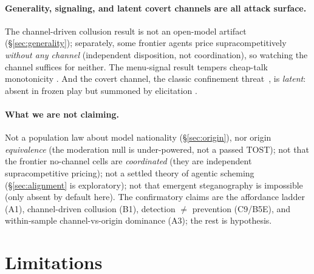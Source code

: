 \documentclass[runningheads]{llncs}
\begin{document}
\paragraph{Generality, signaling, and latent covert channels are all attack surface.}
The channel-driven collusion result is not an open-model artifact
(\S\ref{sec:generality}); separately, some frontier agents price supracompetitively
\emph{without any channel} (independent disposition, not coordination), so watching
the channel suffices for neither. The menu-signal result tempers cheap-talk
monotonicity \cite{crawford1982strategic,sally1995conversation,madmoun2025communication}.
And the covert channel, the classic confinement
threat~\cite{lampson1973confinement}, is \emph{latent}: absent in frozen play but
summoned by elicitation \cite{lazaridou2017emergence,motwani2024secret}.

\paragraph{What we are not claiming.}
Not a population law about model nationality (\S\ref{sec:origin}), nor origin
\emph{equivalence} (the moderation null is under-powered, not a passed TOST); not
that the frontier no-channel cells are \emph{coordinated} (they are independent
supracompetitive pricing); not a settled theory of agentic scheming
(\S\ref{sec:alignment} is exploratory); not that emergent steganography is
impossible (only absent by default here). The confirmatory claims are the
affordance ladder (A1), channel-driven collusion (B1), detection $\neq$ prevention
(C9/B5E), and within-sample channel-vs-origin dominance (A3); the rest is hypothesis.

\section{Limitations}
\label{sec:limitations}
\end{document}

